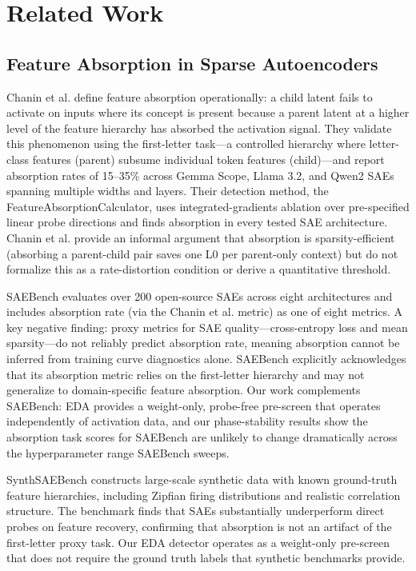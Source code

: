 \documentclass{article}
\begin{document}
\section{Related Work}

\subsection{Feature Absorption in Sparse Autoencoders}

Chanin et al. \citeyear{chanin2024absorption} define feature absorption operationally: a
child latent fails to activate on inputs where its concept is present because a parent latent
at a higher level of the feature hierarchy has absorbed the activation signal. They validate
this phenomenon using the first-letter task---a controlled hierarchy where letter-class
features (parent) subsume individual token features (child)---and report absorption rates of
15--35\% across Gemma Scope, Llama 3.2, and Qwen2 SAEs spanning multiple widths and layers.
Their detection method, the FeatureAbsorptionCalculator, uses integrated-gradients ablation
over pre-specified linear probe directions and finds absorption in every tested SAE
architecture. Chanin et al. provide an informal argument that absorption is sparsity-efficient
(absorbing a parent-child pair saves one L0 per parent-only context) but do not formalize
this as a rate-distortion condition or derive a quantitative threshold.

SAEBench \cite{karvonen2025saebench} evaluates over 200 open-source SAEs across eight
architectures and includes absorption rate (via the Chanin et al. metric) as one of eight
metrics. A key negative finding: proxy metrics for SAE quality---cross-entropy loss and mean
sparsity---do not reliably predict absorption rate, meaning absorption cannot be inferred from
training curve diagnostics alone. SAEBench explicitly acknowledges that its absorption metric
relies on the first-letter hierarchy and may not generalize to domain-specific feature
absorption. Our work complements SAEBench: EDA provides a weight-only, probe-free pre-screen
that operates independently of activation data, and our phase-stability results show the
absorption task scores for SAEBench are unlikely to change dramatically across the
hyperparameter range SAEBench sweeps.

SynthSAEBench \cite{synthsaebench2026} constructs large-scale synthetic data with known
ground-truth feature hierarchies, including Zipfian firing distributions and realistic
correlation structure. The benchmark finds that SAEs substantially underperform direct probes
on feature recovery, confirming that absorption is not an artifact of the first-letter proxy
task. Our EDA detector operates as a weight-only pre-screen that does not require the ground
truth labels that synthetic benchmarks provide.
\end{document}

